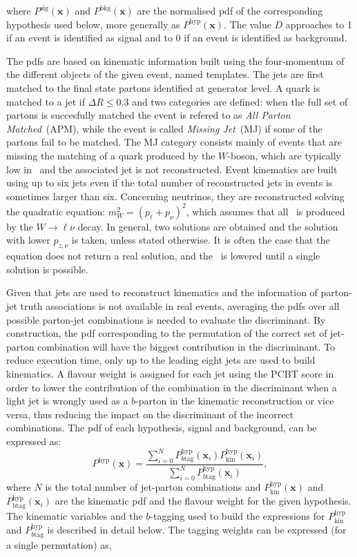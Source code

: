 where $P^{\text{sig}}(\textbf{x})$ and $P^{\text{bkg}}(\textbf{x})$ are the normalised pdf of the corresponding hypothesis used below, more generally as $P^{\text{hyp}}(\textbf{x})$. The value $D$ approaches to 1 if an event is identified as signal and to 0 if an event is identified as background.

The pdfs are based on kinematic information built using the four-momentum of the different objects of the given event, named templates. The jets are first matched to the final state partons identified at generator level. A quark is matched to a jet if $\Delta R\leq 0.3$ and two categories are defined: when the full set of partons is succesfully matched the event is refered to as \textit{All Parton Matched}~(APM), while the event is called \textit{Missing Jet}~(MJ) if some of the partons fail to be matched. The MJ category consists mainly of events that are missing the matching of a quark produced by the $W$-boson, which are typically low in \pT\ and the associated jet is not reconstructed. Event kinematics are built using up to six jets even if the total number of reconstructed jets in events is sometimes larger than six. %
Concerning neutrinos, they are reconstructed solving the quadratic equation: $m_W^2 = (p_\ell + p_\nu)^2$, which assumes that all \MET\ is produced by the $W\to\ell\nu$ decay. In general, two solutions are obtained and the solution with lower $p_{z,\nu}$ is taken, unless stated otherwise. It is often the case that the equation does not return a real solution, and the \MET\ is lowered until a single solution is possible.

Given that jets are used to reconstruct kinematics and the information of parton-jet truth associations is not available in real events, averaging the pdfs over all possible parton-jet combinations is needed to evaluate the discriminant. By construction, the pdf corresponding to the permutation of the correct set of jet-parton combination will have the biggest contribution in the discriminant. To reduce execution time, only up to the leading eight jets are used to build kinematics. A flavour weight is assigned for each jet using the PCBT score in order to lower the contribution of the combination in the discriminant when a light jet is wrongly used as a $b$-parton in the kinematic reconstruction or vice versa, thus reducing the impact on the discriminant of the incorrect combinations. The pdf of each hypothesis, signal and background, can be expressed as:
\begin{equation}
    P^{\text{hyp}}(\textbf{x})=\frac{\sum_{i=0}^N P^{\text{hyp}}_{b\text{tag}}(\textbf{x}_i)P^{\text{hyp}}_{\text{kin}}(\textbf{x}_i)}{\sum_{i=0}^N P^{\text{hyp}}_{b\text{tag}}(\textbf{x}_i)},
    \label{eq3:PDF}
\end{equation}
where $N$ is the total number of jet-parton combinations and $P^{\text{hyp}}_{\text{kin}}(\textbf{x})$ and $P^{\text{hyp}}_{\text{btag}}(\textbf{x}_i)$ are the kinematic pdf and the flavour weight for the given hypothesis. The kinematic variables and the $b$-tagging used to build the expressions for $P^{\text{hyp}}_{\text{kin}}$ and $P^{\text{hyp}}_{b\text{tag}}$ is described in detail below. The tagging weights can be expressed (for a single permutation) as,


